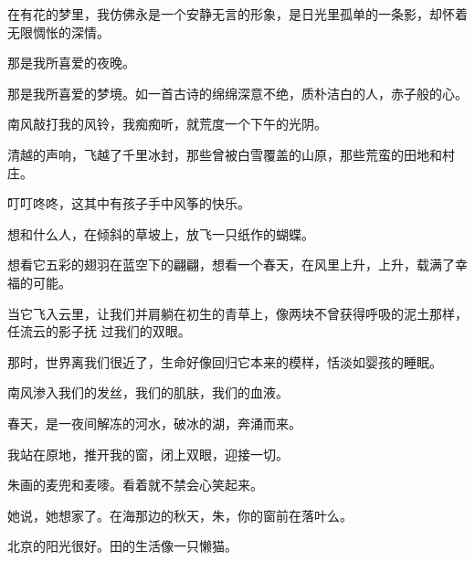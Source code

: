 		在有花的梦里，我仿佛永是一个安静无言的形象，是日光里孤单的一条影，却怀着无限惆怅的深情。

		那是我所喜爱的夜晚。\par
		那是我所喜爱的梦境。如一首古诗的绵绵深意不绝，质朴洁白的人，赤子般的心。

		南风敲打我的风铃，我痴痴听，就荒度一个下午的光阴。\par
		清越的声响，飞越了千里冰封，那些曾被白雪覆盖的山原，那些荒蛮的田地和村庄。

		叮叮咚咚，这其中有孩子手中风筝的快乐。

		想和什么人，在倾斜的草坡上，放飞一只纸作的蝴蝶。\par
		想看它五彩的翅羽在蓝空下的翩翩，想看一个春天，在风里上升，上升，载满了幸福的可能。

		当它飞入云里，让我们并肩躺在初生的青草上，像两块不曾获得呼吸的泥土那样，任流云的影子抚
	过我们的双眼。

		那时，世界离我们很近了，生命好像回归它本来的模样，恬淡如婴孩的睡眠。

		南风渗入我们的发丝，我们的肌肤，我们的血液。

		春天，是一夜间解冻的河水，破冰的湖，奔涌而来。\par
		我站在原地，推开我的窗，闭上双眼，迎接一切。

	\endwriting



		朱画的麦兜和麦嘜。看着就不禁会心笑起来。\par
		她说，她想家了。在海那边的秋天，朱，你的窗前在落叶么。\par
		北京的阳光很好。田的生活像一只懒猫。

